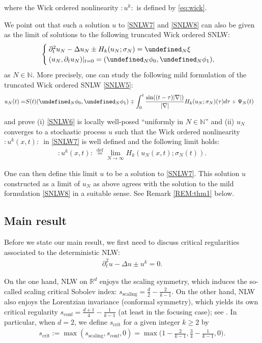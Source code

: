 \documentclass[letterpaper, 11pt,  reqno]{amsart}
\newcommand{\1}{\hspace{0.5mm}\text{I}\hspace{0.5mm}}
\newcommand{\noi}{\noindent}
\newcommand{\R}{\mathbb{R}}
\let\P= \undefined
\newcommand{\P}{\mathbf{P}}
\newcommand{\Dl}{\Delta}
\newcommand{\dt}{\partial_t}
\newcommand{\N}{\mathbb{N}}
\numberwithin{equation}{section}
\numberwithin{theorem}{section}
\begin{document}
\noi
where the Wick ordered nonlinearity 
$\!:\! u^k\!:$ is defined by \eqref{eq:wick}.



We point out that such a solution $u$ to \eqref{SNLW7}
and \eqref{SNLW8}
can also be given as the limit of solutions to 
the following truncated Wick ordered SNLW:
\begin{align}
\begin{cases}
\dt^2 u_N -  \Dl  u_N   \pm H_k(u_N;\sigma_N)  = \P_N \xi \\ 
(u_N, \dt u_N) |_{t = 0} = (\P_N\phi_0, \P_N\phi_1) , 
\end{cases}
\label{SNLW5}
\end{align}
as $N \in \N$. 
More precisely, 
one can study 
the following mild formulation of  the truncated Wick ordered SNLW \eqref{SNLW5}:
\begin{align}
u_N(t)= & S(t)(\P_N\phi_0,   \P_N \phi_1)
 \mp \int_{0}^t  \frac{\sin ((t-\tau)|\nabla|)}{|\nabla|} H_k(u_N;\sigma_N)(\tau) d\tau+ \Psi_N(t) 
\label{SNLW6}
\end{align}


\noi
and prove  (i) \eqref{SNLW6} is locally well-posed
``uniformly in $N \in \N$''
and  (ii) 
 $u_N$ converges to 
a stochastic process $u$ such that 
the Wick ordered nonlinearity $:\! u^k (x, t) \!: \,$ in \eqref{SNLW7}
is well defined  and 
the following limit holds:
\begin{align*}
:\! u^k  (x, t)\!: \,    \stackrel{\text{def}}{=} \lim_{N\to \infty}    H_k(u_N(x, t);\sigma_N(t)).
\end{align*}



\noi
One can then define
 this limit $u$ to be a solution to \eqref{SNLW7}.
This solution $u$ constructed as a limit of $u_N$ as above
agrees with the solution to the mild formulation \eqref{SNLW8}
in a suitable sense.
See Remark \ref{REM:thm1} below.




\subsection{Main result}

Before we state our main result, we first need to discuss
critical regularities associated to  the deterministic NLW:
\begin{align*}
\dt^2 u -  \Dl  u   \pm  u^k = 0.
\end{align*}

\noi
On the one hand, NLW on $\R^d$ enjoys the scaling symmetry, 
which induces the so-called scaling critical Sobolev index:
$s_\text{scaling} = \frac{d}{2} - \frac{2}{k-1}$.
On the other hand, NLW also enjoys
the Lorentzian invariance (conformal symmetry), 
which yields its own critical regularity 
$s_\text{conf} = \frac{d+1}{4} - \frac{1}{k-1}$
(at least in the focusing case);
see \cite{LS}.
\noi
In particular, when $d = 2$, we define $s_\text{crit}$ for a given integer $k \ge 2$ by 
\begin{align}\label{scrit}
s_\text{crit} := \max(s_\text{scaling}, s_\text{conf}, 0) = \max\bigg(1 - \frac{2}{k-1}, 
\frac 34 - \frac1{k-1}, 0\bigg).
\end{align}
\end{document}
